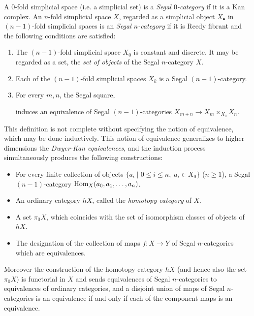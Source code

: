 \documentclass[a4paper]{amsart}
\begin{document}
\begin{definition}
	A $0$-fold simplicial space (i.e. a simplicial set) is a {\em  Segal $0$-category} if it is a Kan complex. An $n$-fold simplicial space $X$, regarded as a simplicial object $X_\bullet$ in $(n-1)$-fold simplicial spaces is an {\em Segal $n$-category} if it is Reedy fibrant and the following conditions are satisfied:
		\begin{enumerate}
			\item The $(n-1)$-fold simplicial space $X_0$ is constant and discrete. It may be regarded as a set, the {\em set of objects} of the Segal $n$-category $X$. 
			\item Each of the $(n-1)$-fold simplicial spaces $X_k$ is a  Segal $(n-1)$-category.
			\item For every $m, n$, the Segal square,
			\begin{center}
			\end{center}
			induces an equivalence of  Segal $(n-1)$-categories $X_{m+n} \to X_m \times_{X_0} X_n$.  
				\end{enumerate}
\end{definition}

\noindent This definition is not complete without specifying the notion of equivalence, which may be done inductively.  This notion of equivalence generalizes to higher dimensions the {\em Dwyer-Kan equivalences}, and the induction process simultaneously produces the following constructions:
\begin{itemize}
	\item For every finite collection of objects $\{ a_i \; | \; 0 \leq i \leq n, \; a_i \in X_0 \}$ ($n \geq 1$),  a Segal $(n-1)$-category $\operatorname{Hom}_X(a_0, a_1, \dots, a_n)$.
	\item An ordinary category $\mathit{h}X$, called the {\em homotopy category} of $X$.
	\item A set $\pi_0 X$, which coincides with the set of isomorphism classes of objects of $\mathit{h}X$.
	\item The designation of the collection of maps  $f:X \to Y$ of Segal $n$-categories which are equivalences. 
\end{itemize}
Moreover the construction of the homotopy category $\mathit{h}X$ (and hence also the set $\pi_0X$) is functorial in $X$ and sends equivalences of Segal $n$-categories to equivalences of ordinary categories, and a disjoint union of maps of Segal $n$-categories is an equivalence if and only if each of the component maps is an equivalence.  
\end{document}
